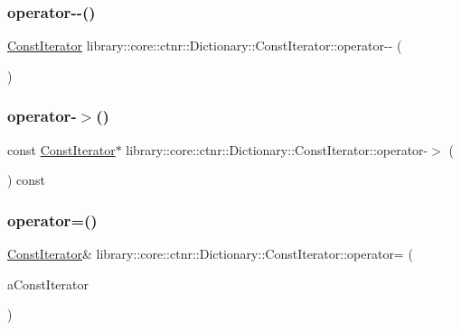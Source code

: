\subsubsection{\texorpdfstring{operator-\/-\/()}{operator--()}\hspace{0.1cm}{\footnotesize\ttfamily [2/2]}}
{\footnotesize\ttfamily \hyperlink{classlibrary_1_1core_1_1ctnr_1_1_dictionary_1_1_const_iterator}{Const\+Iterator} library\+::core\+::ctnr\+::\+Dictionary\+::\+Const\+Iterator\+::operator-\/-\/ (\begin{DoxyParamCaption}\item[{int}]{ }\end{DoxyParamCaption})}

\mbox{\label{classlibrary_1_1core_1_1ctnr_1_1_dictionary_1_1_const_iterator_a244e67b390e9dfab32beb9322e639be1}} 
\subsubsection{\texorpdfstring{operator-\/$>$()}{operator->()}}
{\footnotesize\ttfamily const \hyperlink{classlibrary_1_1core_1_1ctnr_1_1_dictionary_1_1_const_iterator}{Const\+Iterator}$\ast$ library\+::core\+::ctnr\+::\+Dictionary\+::\+Const\+Iterator\+::operator-\/$>$ (\begin{DoxyParamCaption}{ }\end{DoxyParamCaption}) const}

\mbox{\label{classlibrary_1_1core_1_1ctnr_1_1_dictionary_1_1_const_iterator_abb2ceb48b8d53f356fc951952f8e8f32}} 
\subsubsection{\texorpdfstring{operator=()}{operator=()}}
{\footnotesize\ttfamily \hyperlink{classlibrary_1_1core_1_1ctnr_1_1_dictionary_1_1_const_iterator}{Const\+Iterator}\& library\+::core\+::ctnr\+::\+Dictionary\+::\+Const\+Iterator\+::operator= (\begin{DoxyParamCaption}\item[{const \hyperlink{classlibrary_1_1core_1_1ctnr_1_1_dictionary_1_1_const_iterator}{Const\+Iterator} \&}]{a\+Const\+Iterator }\end{DoxyParamCaption})}

